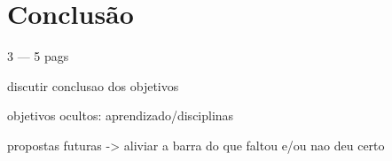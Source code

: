 
\chapter{Conclusão}
3 --- 5 pags

discutir conclusao dos objetivos

objetivos ocultos: aprendizado/disciplinas

propostas futuras -> aliviar a barra do que faltou e/ou nao deu certo

